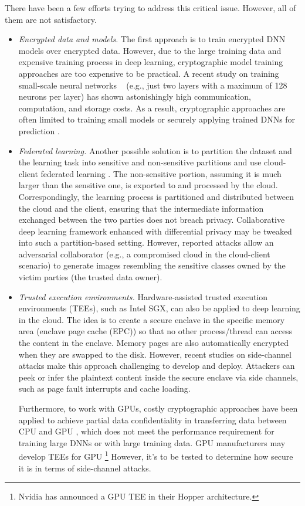 \documentclass[conference]{IEEEtran}
\begin{document}
There have been a few efforts trying to address this critical issue. However, all of them are not satisfactory.
\begin{itemize} 
	\item \emph{Encrypted data and models.} The first approach is to train encrypted DNN models over encrypted data. However, due to the large training data and expensive training process in deep learning, cryptographic model training approaches are too expensive to be practical. A recent study on training small-scale neural networks  ~\cite{mohassel17} (e.g., just two layers with a maximum of 128 neurons per layer)  has shown astonishingly high communication, computation, and storage costs. As a result, cryptographic approaches are often limited to training small models \cite{mohassel17,sharma19} or securely applying trained DNNs for prediction \cite{xie14,rathee20,huang20}. 

	\item \emph{Federated learning.} Another possible solution is to partition the dataset and the learning task into sensitive and non-sensitive partitions and use cloud-client federated learning \cite{kairouz19}. The non-sensitive portion, assuming it is much larger than the sensitive one, is exported to and processed by the cloud. Correspondingly, the learning process is partitioned and distributed between the cloud and the client, ensuring that the intermediate information exchanged between the two parties does not breach privacy. Collaborative deep learning framework enhanced with differential privacy \cite{reza15,abadi16} may be tweaked into such a partition-based setting. However, reported attacks \cite{hitaj17}  allow an adversarial collaborator (e.g., a compromised cloud in the cloud-client scenario) to generate images resembling the sensitive classes owned by the victim parties (the trusted data owner).

\item \emph{Trusted execution environments.} Hardware-assisted trusted execution environments (TEEs), such as Intel SGX, can also be applied to deep learning in the cloud. The idea is to create a secure enclave in the specific memory area (enclave page cache (EPC)) so that no other process/thread can access the content in the enclave. Memory pages are also automatically encrypted when they are swapped to the disk. However, recent studies on side-channel attacks \cite{fei21} make this approach challenging to develop and deploy. Attackers can peek or infer the plaintext content inside the secure enclave via side channels, such as page fault interrupts and cache loading. 

Furthermore, to work with GPUs, costly cryptographic approaches have been applied to achieve partial data confidentiality in transferring data between CPU and GPU \cite{tramer18,ng21}, which does not meet the performance requirement for training large DNNs or with large training data. GPU manufacturers may develop TEEs for GPU \footnote{Nvidia has announced a GPU TEE in their Hopper architecture.} However, it's to be tested to determine how secure it is in terms of side-channel attacks. 

\end{itemize}
\end{document}
